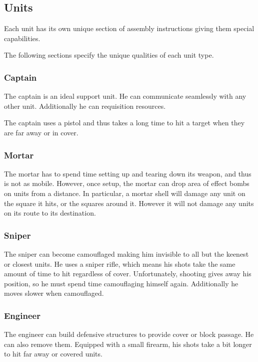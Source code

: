 \documentclass{article}
\begin{document}
\subsection*{Units}

Each unit has its own unique section of assembly instructions giving them
special capabilities.

The following sections specify the unique qualities of each unit type.

\subsubsection*{Captain}

The captain is an ideal support unit. He can communicate seamlessly with any
other unit. Additionally he can requisition resources.

The captain uses a pistol and thus takes a long time to hit a target when they
are far away or in cover.

\subsubsection*{Mortar}

The mortar has to spend time setting up and tearing down its weapon, and thus is
not as mobile. However, once setup, the mortar can drop area of effect bombs on
units from a distance. In particular, a mortar shell will damage any unit on the
square it hits, or the squares around it. However it will not damage any units
on its route to its destination.

\subsubsection*{Sniper}

The sniper can become camouflaged making him invisible to all but the keenest or
closest units. He uses a sniper rifle, which means his shots take the same
amount of time to hit regardless of cover. Unfortunately, shooting gives away
his position, so he must spend time camouflaging himself again. Additionally he
moves slower when camouflaged.

\subsubsection*{Engineer}

The engineer can build defensive structures to provide cover or block passage.
He can also remove them. Equipped with a small firearm, his shots take a bit
longer to hit far away or covered units.
\end{document}
